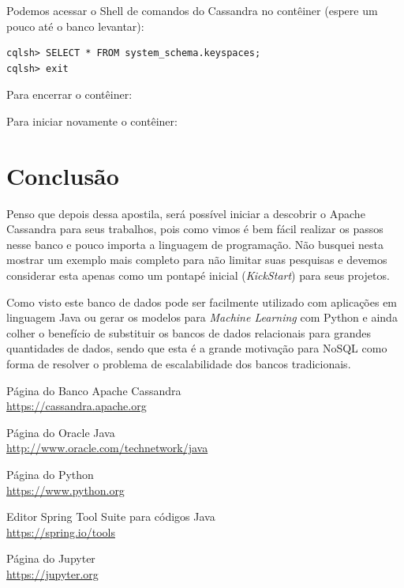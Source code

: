 \documentclass[a4paper,11pt]{article}
\begin{document}
Podemos acessar o Shell de comandos do Cassandra no contêiner (espere um pouco até o banco levantar): \\
\begin{lstlisting}[]
cqlsh> SELECT * FROM system_schema.keyspaces;
cqlsh> exit
\end{lstlisting}

Para encerrar o contêiner: \\

Para iniciar novamente o contêiner: \\





\section{Conclusão}
Penso que depois dessa apostila, será possível iniciar a descobrir o Apache Cassandra para seus trabalhos, pois como vimos é bem fácil realizar os passos nesse banco e pouco importa a linguagem de programação. Não busquei nesta mostrar um exemplo mais completo para não limitar suas pesquisas e devemos considerar esta apenas como um pontapé inicial (\textit{KickStart}) para seus projetos.

Como visto este banco de dados pode ser facilmente utilizado com aplicações em linguagem Java ou gerar os modelos para \textit{Machine Learning} com Python e ainda colher o benefício de substituir os bancos de dados relacionais para grandes quantidades de dados, sendo que esta é a grande motivação para NoSQL como forma de resolver o problema de escalabilidade dos bancos tradicionais.



\begin{thebibliography}{8}
  Página do Banco Apache Cassandra \\
  \url{https://cassandra.apache.org}

  Página do Oracle Java \\
  \url{http://www.oracle.com/technetwork/java}
  
  Página do Python \\
  \url{https://www.python.org}

  Editor Spring Tool Suite para códigos Java \\
  \url{https://spring.io/tools}

  Página do Jupyter \\
  \url{https://jupyter.org}

  
\end{thebibliography}
  
\end{document}

